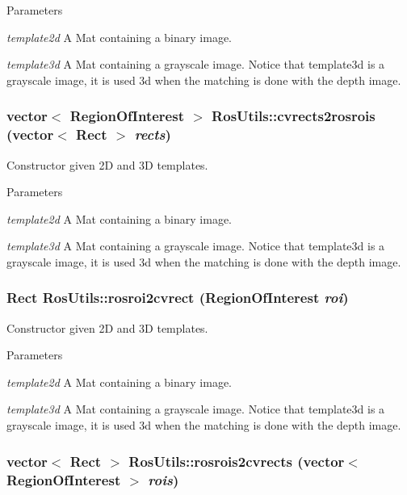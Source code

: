 \begin{DoxyParams}{Parameters}
\item[{\em template2d}]A Mat containing a binary image. \item[{\em template3d}]A Mat containing a grayscale image. Notice that template3d is a grayscale image, it is used 3d when the matching is done with the depth image. \end{DoxyParams}
\hypertarget{classRosUtils_a10a6552d95ab7a6ee4122af4c4137523}{
\subsubsection[{cvrects2rosrois}]{\setlength{\rightskip}{0pt plus 5cm}vector$<$ RegionOfInterest $>$ RosUtils::cvrects2rosrois (vector$<$ Rect $>$ {\em rects})}}
\label{classRosUtils_a10a6552d95ab7a6ee4122af4c4137523}
Constructor given 2D and 3D templates. 
\begin{DoxyParams}{Parameters}
\item[{\em template2d}]A Mat containing a binary image. \item[{\em template3d}]A Mat containing a grayscale image. Notice that template3d is a grayscale image, it is used 3d when the matching is done with the depth image. \end{DoxyParams}
\hypertarget{classRosUtils_af79ad6781024a9d081fdc8cf67782269}{
\subsubsection[{rosroi2cvrect}]{\setlength{\rightskip}{0pt plus 5cm}Rect RosUtils::rosroi2cvrect (RegionOfInterest {\em roi})}}
\label{classRosUtils_af79ad6781024a9d081fdc8cf67782269}
Constructor given 2D and 3D templates. 
\begin{DoxyParams}{Parameters}
\item[{\em template2d}]A Mat containing a binary image. \item[{\em template3d}]A Mat containing a grayscale image. Notice that template3d is a grayscale image, it is used 3d when the matching is done with the depth image. \end{DoxyParams}
\hypertarget{classRosUtils_aadb640f35f26394dfd6240b17c95c942}{
\subsubsection[{rosrois2cvrects}]{\setlength{\rightskip}{0pt plus 5cm}vector$<$ Rect $>$ RosUtils::rosrois2cvrects (vector$<$ RegionOfInterest $>$ {\em rois})}}
